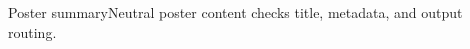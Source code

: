 \documentclass[config/load-project=false,document/type=poster,metadata/title={Reference Publication Demo},metadata/author={Reference Authors},metadata/institution={Example Publishing Lab}]{insr}
\begin{document}
\INSRMakeTitle\begin{frame}{Poster summary}Neutral poster content checks title, metadata, and output routing.\end{frame}
\end{document}
